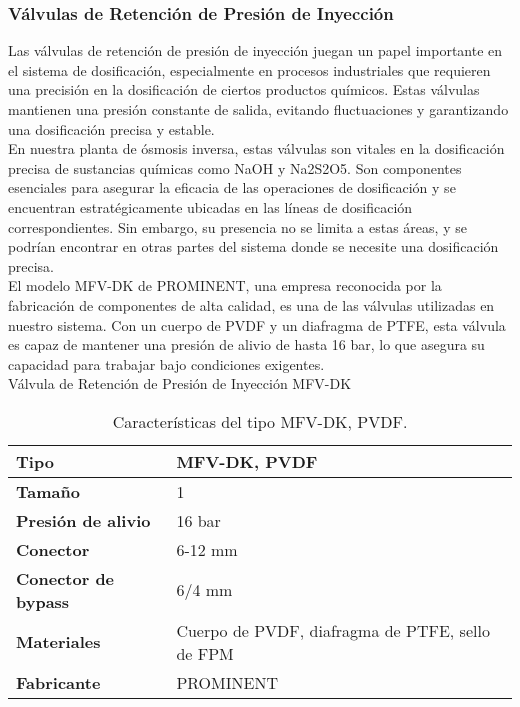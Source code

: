 \subsubsection{Válvulas de Retención de Presión de Inyección}

Las válvulas de retención de presión de inyección juegan un papel importante en el sistema de dosificación, especialmente en procesos industriales que requieren una precisión en la dosificación de ciertos productos químicos. Estas válvulas mantienen una presión constante de salida, evitando fluctuaciones y garantizando una dosificación precisa y estable.\\

En nuestra planta de ósmosis inversa, estas válvulas son vitales en la dosificación precisa de sustancias químicas como NaOH y Na2S2O5. Son componentes esenciales para asegurar la eficacia de las operaciones de dosificación y se encuentran estratégicamente ubicadas en las líneas de dosificación correspondientes. Sin embargo, su presencia no se limita a estas áreas, y se podrían encontrar en otras partes del sistema donde se necesite una dosificación precisa.\\

El modelo MFV-DK de PROMINENT, una empresa reconocida por la fabricación de componentes de alta calidad, es una de las válvulas utilizadas en nuestro sistema. Con un cuerpo de PVDF y un diafragma de PTFE, esta válvula es capaz de mantener una presión de alivio de hasta 16 bar, lo que asegura su capacidad para trabajar bajo condiciones exigentes.\\

Válvula de Retención de Presión de Inyección MFV-DK\\

\begin{table}[H]
    \centering
    \caption{Características del tipo MFV-DK, PVDF.}
    \label{table:valvula_retencion}
    \begin{tabular}{| L{5cm} | L{5cm} |}
        \hline
        \textbf{Tipo} & MFV-DK, PVDF \\
        \hline
        \textbf{Tamaño} & 1 \\
        \hline
        \textbf{Presión de alivio} & 16 bar \\
        \hline
        \textbf{Conector} & 6-12 mm \\
        \hline
        \textbf{Conector de bypass} & 6/4 mm \\
        \hline
        \textbf{Materiales} & Cuerpo de PVDF, diafragma de PTFE, sello de FPM \\
        \hline
        \textbf{Fabricante} & PROMINENT \\
        \hline
    \end{tabular}
\end{table}
